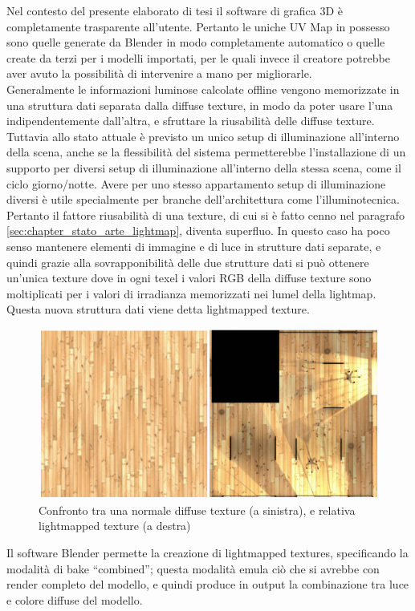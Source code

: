 Nel contesto del presente elaborato di tesi il software di grafica 3D è completamente trasparente all’utente. Pertanto le uniche UV Map in possesso sono quelle generate da Blender in modo completamente automatico o quelle create da terzi per i modelli importati, per le quali invece il creatore potrebbe aver avuto la possibilità di intervenire a mano per migliorarle.
\\
Generalmente le informazioni luminose calcolate offline vengono memorizzate in una struttura dati separata dalla diffuse texture, in modo da poter usare l’una indipendentemente dall’altra, e sfruttare la riusabilità delle diffuse texture.
\\ 
Tuttavia allo stato attuale è previsto un unico setup di illuminazione all’interno della scena, anche se la flessibilità del sistema permetterebbe l’installazione di un supporto per diversi setup di illuminazione all’interno della stessa scena, come il ciclo giorno/notte.  Avere per uno stesso appartamento setup di illuminazione diversi è utile specialmente per branche dell’architettura come l’illuminotecnica. Pertanto il fattore riusabilità di una texture, di cui si è fatto cenno nel paragrafo \ref{sec:chapter_stato_arte_lightmap}, diventa superfluo. 
In questo caso ha poco senso mantenere elementi di immagine e di luce in strutture dati separate, e quindi grazie alla sovrapponibilità delle due strutture dati si può ottenere un’unica texture dove in ogni texel i valori RGB della diffuse texture sono moltiplicati per i valori di irradianza memorizzati nei lumel della lightmap. Questa nuova struttura dati viene detta lightmapped texture. 
\\
\begin{figure}[htb]
 \centering
 \includegraphics[width=1\linewidth]{images/chapter_lrl/lrl_li_te.png}\hfill
 \caption[Lightmapped texture]{Confronto tra una normale diffuse texture (a sinistra), e relativa lightmapped texture (a destra)}
 \label{fig:lrl_li_te}
\end{figure}
Il software Blender permette la creazione di lightmapped textures, specificando la modalità di bake “combined”; questa modalità emula ciò che si avrebbe con render completo del modello, e quindi produce in output la combinazione tra luce e colore diffuse del modello.